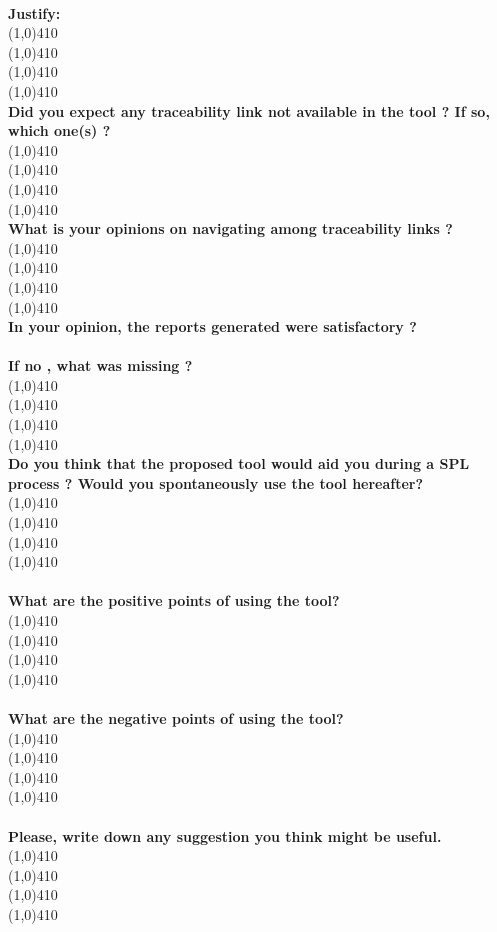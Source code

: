 \\
\textbf{Justify:}
\\
\line(1,0){410}
\\
\line(1,0){410}
\\
\line(1,0){410}
\\
\line(1,0){410}
\\
\textbf{Did you expect any traceability link not available in the tool ? If so, which one(s) ?}
\\
\line(1,0){410}
\\
\line(1,0){410}
\\
\line(1,0){410}
\\
\line(1,0){410}
\\
\textbf{What is your opinions on navigating among traceability links ?}
\\
\line(1,0){410}
\\
\line(1,0){410}
\\
\line(1,0){410}
\\
\line(1,0){410}
\\
\textbf{In your opinion, the reports generated were satisfactory ?}
\\
\\
\textbf{If no , what was missing ?}
\\
\line(1,0){410}
\\
\line(1,0){410}
\\
\line(1,0){410}
\\
\line(1,0){410}
\\
\textbf{Do you think that the proposed tool would aid you during a SPL process ? Would you spontaneously use the tool hereafter?}
\\
\line(1,0){410}
\\
\line(1,0){410}
\\
\line(1,0){410}
\\
\line(1,0){410}
\\
\\
\textbf{What are the positive points of using the tool?}
\\
\line(1,0){410}
\\
\line(1,0){410}
\\
\line(1,0){410}
\\
\line(1,0){410}
\\
\\
\textbf{What are the negative points of using the tool?}
\\
\line(1,0){410}
\\
\line(1,0){410}
\\
\line(1,0){410}
\\
\line(1,0){410}
\\
\\
\textbf{Please, write down any suggestion you think might be useful.}
\\
\line(1,0){410}
\\
\line(1,0){410}
\\
\line(1,0){410}
\\
\line(1,0){410}
\\

